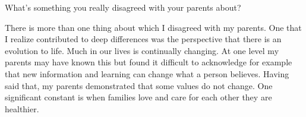 What's something you really disagreed with your parents about?

There is more than one thing about which I disagreed with my parents. One that I realize contributed to deep differences was the perspective that there is an evolution to life. Much in our lives is continually changing. At one level my parents may have known this but found it difficult to acknowledge for example that new information and learning can change what a person believes. Having said that, my parents demonstrated that some values do not change. One significant constant is when families love and care for each other they are healthier. 




